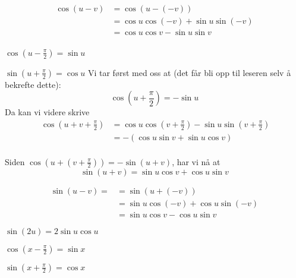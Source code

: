 {
\begin{align*}
\cos (u-v)&= \cos (u-(-v)) \\
&= \cos u \cos (-v) + \sin u \sin (-v) \\
&= \cos u \cos v - \sin u \sin v 
\end{align*} \\

{\boldmath $ \cos\left(u-\frac{\pi}{2}\right)=\sin u $}

{\boldmath $ \sin \left(u + \frac{\pi}{2}\right)=\cos u $} 
\bs
Vi tar først med oss at (det får bli opp til leseren selv å bekrefte dette):
\[ \cos \left(u+\frac{\pi}{2}\right)=-\sin u \]
Da kan vi videre skrive
\begin{align*}\
\cos \left(u+ v+\frac{\pi}{2}\right) &= \cos u \cos \left(v+\frac{\pi}{2}\right) - \sin u \sin\left(v+\frac{\pi}{2}\right) \\
&= -(\cos u \sin v + \sin u \cos v )
\end{align*} 
\\
Siden  $ \cos \left(u+ \left(v+\frac{\pi}{2}\right)\right) = -\sin (u+v) $, har vi nå at
\[\sin (u+v) = \sin u \cos v +\cos u \sin v \]

 \label{sin2xbevis}
\begin{align*}
\sin(u-v) =&=\sin (u+(-v)) \\
&= \sin u \cos (-v) + \cos u \sin (-v) \\
&= \sin u \cos v - \cos u \sin v 
\end{align*}

{\boldmath $ \sin (2u)=2\sin u \cos u $}

{\boldmath $ \cos\left(x-\frac{\pi}{2}\right)=\sin x $}

{\boldmath $ \sin\left(x+\frac{\pi}{2}\right)=\cos x $}
}





